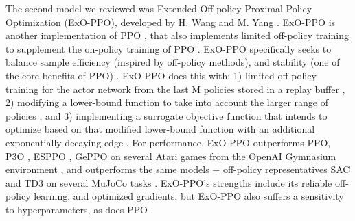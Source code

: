\documentclass[conference]{IEEEtran}
\begin{document}
The second model we reviewed was Extended Off-policy Proximal Policy Optimization (ExO-PPO), 
developed by H. Wang and M. Yang \cite{b5}. ExO-PPO is another implementation of PPO \cite{b2}, that also implements 
limited off-policy training to supplement the on-policy training of PPO \cite{b5}. ExO-PPO specifically seeks to balance 
sample efficiency (inspired by off-policy methods), and stability (one of the core benefits of PPO) \cite{b5}. 
ExO-PPO does this with: 1) limited off-policy training for the actor network from the last M policies 
stored in a replay buffer \cite{b5}, 2) modifying a lower-bound function to take into account the larger range 
of policies \cite{b5}, and 3) implementing a surrogate objective function that intends to optimize based on 
that modified lower-bound function with an additional exponentially decaying edge \cite{b5}. For performance, 
ExO-PPO outperforms PPO, P3O \cite{b6} \cite{b5}, ESPPO \cite{b7} \cite{b5}, GePPO \cite{b8} on several Atari games from the OpenAI 
Gymnasium environment \cite{b5}, and outperforms the same models + off-policy representatives SAC 
\cite{b3} and TD3 \cite{b9} on several MuJoCo tasks \cite{b5}. ExO-PPO's strengths include its reliable 
off-policy learning, and optimized gradients, but ExO-PPO also suffers a sensitivity to hyperparameters, 
as does PPO \cite{b5}. 
\end{document}
